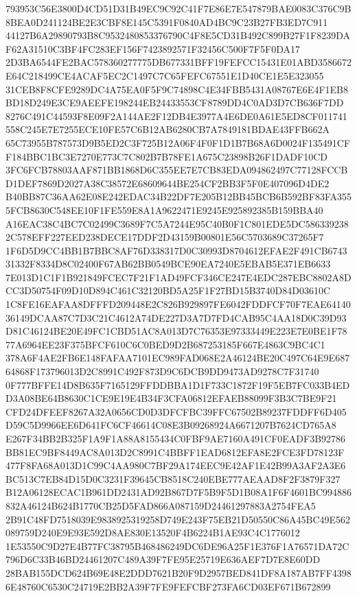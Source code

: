 \documentclass[UTF8,fontset=fandol,zihao=-4,a4paper]{ctexart}
\begin{document}
{{793953C56E3800D4CD51D31B49EC9C92C41F7E86E7E547879BAE0083C376C9B8BEA0D241124BE2E3CBF8E145C5391F0840AD4BC9C23B27FB3ED7C911
44127B6A29890793B8C9532480853376790C4F8E5CD31B492C899B27F1F8239DAF62A31510C3BF4FC283EF156F7423892571F32456C500F7F5F0DA17
2D3BA6544FE2BAC578360277775DB677331BFF19FEFCC15431E01ABD3586672E64C218499CE4ACAF5EC2C1497C7C65FEFC67551E1D40CE1E5E323055
31CEB8F8CFE9289DC4A75EA0F5F9C74898C4E34FBB5431A08767E6E4F1EB8BD18D249E3CE9AEEFE198244EB24433553CF8789DD4C0AD3D7CB636F7DD
8276C491C44593F8E09F2A144AE2F12DB4E3977A4E6DE0A61E5ED8CF011741558C245E7E7255ECE10FE57C6B12AB6280CB7A7849181BDAE43FFB662A
65C73955B787573D9B5ED2C3F725B12A06F4F0F1D1B7B68A6D0024F135491CFF184BBC1BC3E7270E773C7C802B7B78FE1A675C23898B26F1DADF10CD
3FC6FCB78803AAF871BB1868D6C355EE7E7CB83EDA094862497C77128FCCBD1DEF7869D2027A38C38572E68609644BE254CF2BB3F5F0E407096D4DE2
B40BB87C36AA62E08E242EDAC34B22DF7E205B12BB45BCB6B592BF83FA3555FCB8630C548EE10F1FE559E8A1A9622471E9245E925892385B159BBA40
A16EAC38C4BC7C02499C3689F7C5A7244E95C40B0F1C801EDE5DC5863392382C578EFF227EED238DECE17DDF2D43159B00801E56C5703689C37265F7
1F6D5D9CC4BB1B7BBC8AF76D338317D0C30993D8704612EFAE2F491CB674331332F8334D8C02400F67AB62BB0549BCE90EA7240E5EBAB5E371EB6633
7E013D1C1F1B921849FCEC7F21F1AD49FCF346CE247E4EDC287EBC8802A8DCC3D50754F09D10D894C461C32120BD5A25F1F27BD15B3740D84D03610C
1C8FE16EAFAA8DFFFD209448E2C826B929897FE6042FDDFCF70F7EAE6414036149DCAA87C7D3C21C4612A74DE227D3A7D7FD4CAB95C4AA18D0C39D93
D81C46124BE20E49FC1CBD51AC8A013D7C76353E97333449E223E7E0BE1F7877A6964EE23F375BFCF610C6C0BED9D2B687253185F667E4863C9BC4C1
378A6F4AE2FB6E148FAFAA7101EC989FAD068E2A46124BE20C497C64E9E68764868F173796013D2C8991C492F873D9C6DCB9DD9473AD9278C7F31740
0F777BFFE14D8B635F7165129FFDDBBA1D1F733C1872F19F5EB7FC033B4EDD3A08BE64B8630C1CE9E19E4B34F3CFA06812EFAEB88099F3B3C7BE9F21
CFD24DFEEF8267A32A0656CD0D3DFCFBC39FFC67502B89237FDDFF6D405D59C5D9966EE6D641FC6CF46614C08E3B09268924A6671207B7624CD765A8
E267F34BB2B325F1A9F1A88A8155434C0FBF9AE7160A491CF0EADF3B92786BB81EC9BF8449AC8A013D2C8991C4BBFF1EAD6812EFA8E2FCE3FD78123F
477F8FA68A013D1C99C4AA980C7BF29A174EEC9E42AF1E42B99A3AF2A3E6BC513C7EB84D15D0C3231F39645CB8518C240EBE777AEAAD8F2F3879F327
B12A06128ECAC1B961DD2431AD92B867D7F5B9F5D1B08A1F6F4601BC994886832A46124B624B1770CB25D5FAD866A087159D24461297883A2754FEA5
2B91C48FD7518039E9838925319258D749E243F75EB21D50550C86A45BC49E562089759D240E9E93E592D8AE830E13520F4B6224B1AE93C4C1776012
1E53550C9D27E4B77FC38795B468486249DC6DE96A25F1E376F1A76571DA72C796D6C33B46BD24461207C489A39F7FE95E25719E636AEF7D7E8E60DD
28BAB155DCD624B69E48E2DDD7621B20F9D2957BED841DF8A187AB7FF43986E48760C6530C24719E2BB2A39F7FE9FEFCBF273FA6CD03EF671B672899
}}
\end{document}
